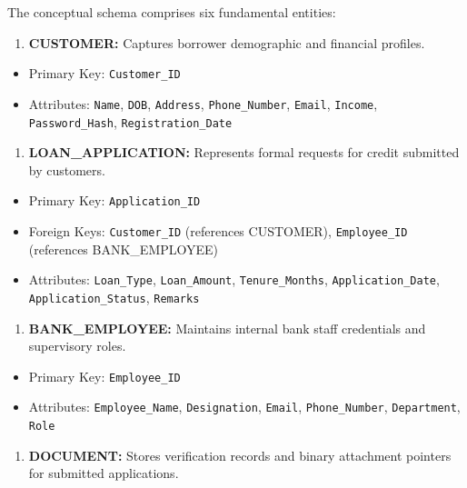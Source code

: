 \documentclass[12pt,a4paper,oneside]{report}
\begin{document}
The conceptual schema comprises six fundamental entities:

\begin{enumerate}
  \item \textbf{CUSTOMER:} Captures borrower demographic and financial profiles.
\end{enumerate}

\begin{itemize}
  \item Primary Key: \texttt{Customer\_ID}
  \item Attributes: \texttt{Name}, \texttt{DOB}, \texttt{Address}, \texttt{Phone\_Number}, \texttt{Email}, \texttt{Income}, \texttt{Password\_Hash}, \texttt{Registration\_Date}
\end{itemize}

\begin{enumerate}
  \item \textbf{LOAN\_APPLICATION:} Represents formal requests for credit submitted by customers.
\end{enumerate}

\begin{itemize}
  \item Primary Key: \texttt{Application\_ID}
  \item Foreign Keys: \texttt{Customer\_ID} (references CUSTOMER), \texttt{Employee\_ID} (references BANK\_EMPLOYEE)
  \item Attributes: \texttt{Loan\_Type}, \texttt{Loan\_Amount}, \texttt{Tenure\_Months}, \texttt{Application\_Date}, \texttt{Application\_Status}, \texttt{Remarks}
\end{itemize}

\begin{enumerate}
  \item \textbf{BANK\_EMPLOYEE:} Maintains internal bank staff credentials and supervisory roles.
\end{enumerate}

\begin{itemize}
  \item Primary Key: \texttt{Employee\_ID}
  \item Attributes: \texttt{Employee\_Name}, \texttt{Designation}, \texttt{Email}, \texttt{Phone\_Number}, \texttt{Department}, \texttt{Role}
\end{itemize}

\begin{enumerate}
  \item \textbf{DOCUMENT:} Stores verification records and binary attachment pointers for submitted applications.
\end{enumerate}
\end{document}
